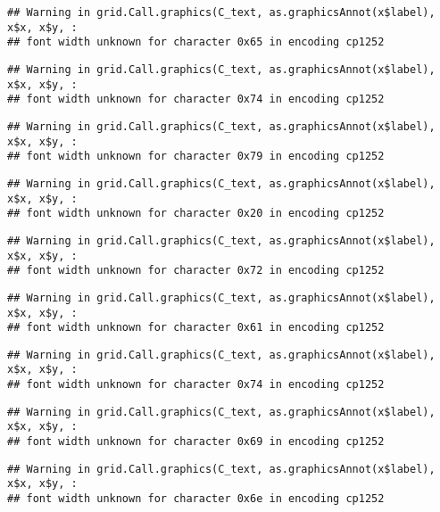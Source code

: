 \documentclass[
]{article}
\begin{document}
\begin{verbatim}
## Warning in grid.Call.graphics(C_text, as.graphicsAnnot(x$label), x$x, x$y, :
## font width unknown for character 0x65 in encoding cp1252
\end{verbatim}

\begin{verbatim}
## Warning in grid.Call.graphics(C_text, as.graphicsAnnot(x$label), x$x, x$y, :
## font width unknown for character 0x74 in encoding cp1252
\end{verbatim}

\begin{verbatim}
## Warning in grid.Call.graphics(C_text, as.graphicsAnnot(x$label), x$x, x$y, :
## font width unknown for character 0x79 in encoding cp1252
\end{verbatim}

\begin{verbatim}
## Warning in grid.Call.graphics(C_text, as.graphicsAnnot(x$label), x$x, x$y, :
## font width unknown for character 0x20 in encoding cp1252
\end{verbatim}

\begin{verbatim}
## Warning in grid.Call.graphics(C_text, as.graphicsAnnot(x$label), x$x, x$y, :
## font width unknown for character 0x72 in encoding cp1252
\end{verbatim}

\begin{verbatim}
## Warning in grid.Call.graphics(C_text, as.graphicsAnnot(x$label), x$x, x$y, :
## font width unknown for character 0x61 in encoding cp1252
\end{verbatim}

\begin{verbatim}
## Warning in grid.Call.graphics(C_text, as.graphicsAnnot(x$label), x$x, x$y, :
## font width unknown for character 0x74 in encoding cp1252
\end{verbatim}

\begin{verbatim}
## Warning in grid.Call.graphics(C_text, as.graphicsAnnot(x$label), x$x, x$y, :
## font width unknown for character 0x69 in encoding cp1252
\end{verbatim}

\begin{verbatim}
## Warning in grid.Call.graphics(C_text, as.graphicsAnnot(x$label), x$x, x$y, :
## font width unknown for character 0x6e in encoding cp1252
\end{verbatim}
\end{document}
